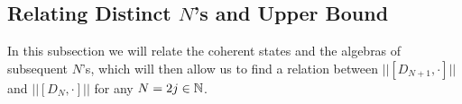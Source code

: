\subsection{Relating Distinct $N$'s and Upper Bound}

 


 





In this subsection we will relate the coherent states and the algebras of subsequent $N$'s, which will then allow us to find a relation between $||[D_{N+1}, \cdot]||$ and $||[D_N, \cdot]||$ for any $N = 2j \in \mathbb{N}$.

